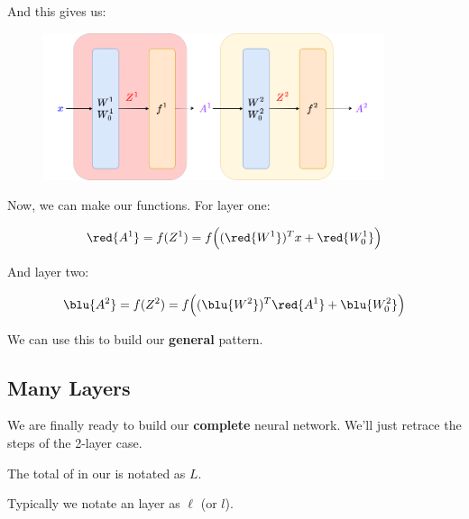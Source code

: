         And this gives us:
        
        \begin{figure}[H]
            \centering
            \includegraphics[width=100mm,scale=0.4]{images/nn_images/two_layer_new_notation.png}
        \end{figure}
        
        Now, we can make our functions. For layer one:
        
        \begin{equation}
            \red{A^1} = f(Z^1) = 
            f  
            \Big( 
                (\red{W^1})^T x + \red{W_0^1} 
            \Big)
        \end{equation}
        
        And layer two:
        
        \begin{equation}
            \blu{A^2} = f(Z^2) = 
            f  
            \Big( 
                (\blu{W^2})^T \red{A^1} + \blu{W_0^2} 
            \Big)
        \end{equation}
        
        We can use this to build our \textbf{general} pattern.
        
    \subsection{Many Layers}
    
        We are finally ready to build our \textbf{complete} neural network. We'll just retrace the steps of the 2-layer case.\\
        
        \begin{notation}
            The total  of  in our  is notated as $L$.
            
            Typically we notate an  layer as $\ell$ (or $l$).
        \end{notation}
        
